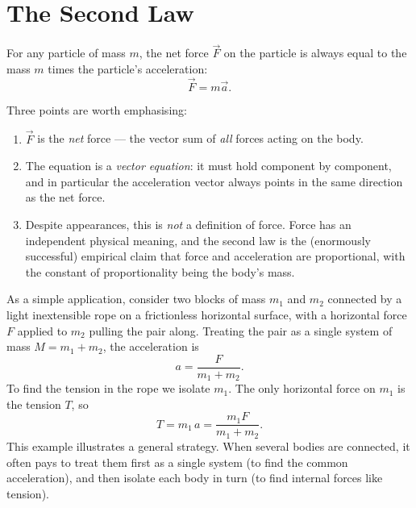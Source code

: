 \section{The Second Law}

\begin{keybox}
For any particle of mass $m$, the net force $\vec{F}$ on the particle is always equal to the
mass $m$ times the particle's acceleration:
\begin{equation}
  \vec{F} = m\vec{a}.
\end{equation}
\end{keybox}

Three points are worth emphasising:
\begin{enumerate}
  \item $\vec{F}$ is the \emph{net} force --- the vector sum of \emph{all} forces acting on the body.
  \item The equation is a \emph{vector equation}: it must hold component by component, and in
        particular the acceleration vector always points in the same direction as the net force.
  \item Despite appearances, this is \emph{not} a definition of force. Force has an independent
        physical meaning, and the second law is the (enormously successful) empirical claim that
        force and acceleration are proportional, with the constant of proportionality being the
        body's mass.
\end{enumerate}

As a simple application, consider two blocks of mass $m_1$ and $m_2$ connected by a light
inextensible rope on a frictionless horizontal surface, with a horizontal force $F$ applied to
$m_2$ pulling the pair along. Treating the pair as a single system of mass $M=m_1+m_2$, the
acceleration is
\begin{equation}
  a = \frac{F}{m_1+m_2}.
\end{equation}
To find the tension in the rope we isolate $m_1$. The only horizontal force on $m_1$ is the
tension $T$, so
\begin{equation}
  T = m_1\,a = \frac{m_1 F}{m_1+m_2}.
\end{equation}
This example illustrates a general strategy. When several bodies are connected, it often pays
to treat them first as a single system (to find the common acceleration), and then isolate
each body in turn (to find internal forces like tension).

